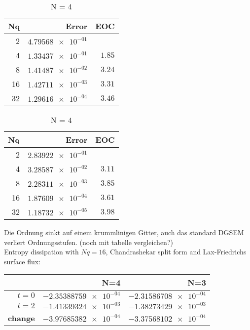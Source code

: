 \documentclass[11pt]{scrartcl}
\begin{document}
\begin{table}[H]
\parbox{.45\linewidth}{
\centering
    \begin{tabular}{|r|r|r|}
    \hline\hline
    \textbf{Nq} & \textbf{Error} & \textbf{EOC} \\\hline
    2 & $\num{4.79568e-01}$ & $\num{}$ \\
    4 & $\num{1.33437e-01}$ & $\num{1.85}$ \\
    8 & $\num{1.41487e-02}$ & $\num{3.24}$ \\
    16 & $\num{1.42711e-03}$ & $\num{3.31}$ \\
    32 & $\num{1.29616e-04}$ & $\num{3.46}$ \\\hline\hline
  \end{tabular} 
  \caption{N = $3$}
  }
  \parbox{.45\linewidth}{
	\centering
    \begin{tabular}{|r|r|r|}
    \hline\hline
    \textbf{Nq} & \textbf{Error} & \textbf{EOC} \\\hline
    2 & $\num{2.83922e-01}$ & $\num{}$ \\
    4 & $\num{3.28587e-02}$ & $\num{3.11}$ \\
    8 & $\num{2.28311e-03}$ & $\num{3.85}$ \\
    16 & $\num{1.87609e-04}$ & $\num{3.61}$ \\
    32 & $\num{1.18732e-05}$ & $\num{3.98}$ \\\hline\hline
  \end{tabular}
   \caption{N = $4$}
  }
\end{table}
Die Ordnung sinkt auf einem krummlinigen Gitter, auch das standard DGSEM verliert Ordnungsstufen. (noch mit tabelle vergleichen?) \\
Entropy dissipation with $Nq = 16$, Chandrashekar split form and Lax-Friedrichs surface flux: \\
\begin{table}[H]
\centering
\begin{tabular}{|r|r|r|}
    \hline\hline
     & \textbf{N=4} & \textbf{N=3} \\\hline
    \textbf{$t=0$} & $\num{-2.35388759e-04}$ & $\num{-2.31586708e-04}$ \\
    \textbf{$t=2$} &  $\num{-1.41339324e-03}$ & $\num{-1.38273429e-03}$ \\
    \textbf{change} & $\num{-3.97685382e-04}$ & $\num{-3.37568102e-04}$ \\\hline\hline
\end{tabular}
\end{table}
\end{document}
